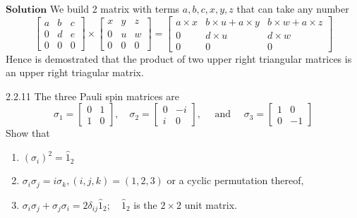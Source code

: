\documentclass{article}
\begin{document}
\begin{flushleft}
$\boxed{\textbf{Solution}}$ We build 2 matrix with terms $a,b,c,x,y,z$ that can take any number
$$\begin{bmatrix}{a} & {b} & {c} \\ {0} & {d} & {e} \\ {0} & {0} & {0}\end{bmatrix} \times\begin{bmatrix}{x} & {y} & {z} \\ {0} & {u} & {w} \\ {0} & {0} & {0}\end{bmatrix}=\begin{bmatrix}{a\times x} & {b \times u+a\times y} & {b \times w+a\times z} \\ {0} & {d \times u} & {d \times w} \\ {0} & {0} & {0}\end{bmatrix}$$
Hence is demostrated that the product of two upper right triangular matrices is an upper right triagular matrix.


\begin{mybox}{2.2.11}
The three Pauli spin matrices are
$$
\sigma_{1}=\begin{bmatrix}{0} & {1} \\ {1} & {0}\end{bmatrix}, \quad \sigma_{2}=\begin{bmatrix}{0} & {-i} \\ {i} & {0}\end{bmatrix}, \quad \text { and } \quad \sigma_{3}=\begin{bmatrix}{1} & {0} \\ {0} & {-1}\end{bmatrix}
$$
Show that

\begin{enumerate}[$(a)$]
\item $\left(\sigma_{i}\right)^{2}=\hat{1}_{2}$
\item $\sigma_{i} \sigma_{j}=i \sigma_{k},(i, j, k)=(1,2,3)$ or a cyclic permutation thereof,
\item $\sigma_{i} \sigma_{j}+\sigma_{j} \sigma_{i}=2 \delta_{i j} \hat{1}_{2} ; \quad \hat{1}_{2}$ is the $2 \times 2$ unit matrix.
\end{enumerate}
\end{mybox}


\end{flushleft}
\end{document}
